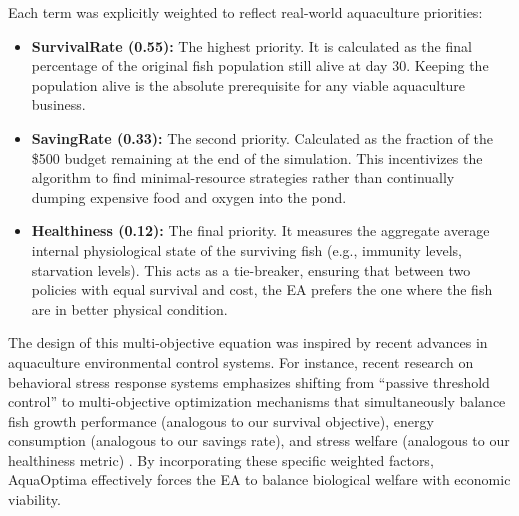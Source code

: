 \documentclass[conference]{IEEEtran}
\begin{document}
Each term was explicitly weighted to reflect real-world aquaculture priorities:
\begin{itemize}
    \item \textbf{SurvivalRate (0.55):} The highest priority. It is calculated as the final percentage of the original fish population still alive at day 30. Keeping the population alive is the absolute prerequisite for any viable aquaculture business.
    \item \textbf{SavingRate (0.33):} The second priority. Calculated as the fraction of the \$500 budget remaining at the end of the simulation. This incentivizes the algorithm to find minimal-resource strategies rather than continually dumping expensive food and oxygen into the pond.
    \item \textbf{Healthiness (0.12):} The final priority. It measures the aggregate average internal physiological state of the surviving fish (e.g., immunity levels, starvation levels). This acts as a tie-breaker, ensuring that between two policies with equal survival and cost, the EA prefers the one where the fish are in better physical condition.
\end{itemize}

The design of this multi-objective equation was inspired by recent advances in aquaculture environmental control systems. For instance, recent research on behavioral stress response systems emphasizes shifting from ``passive threshold control'' to multi-objective optimization mechanisms that simultaneously balance fish growth performance (analogous to our survival objective), energy consumption (analogous to our savings rate), and stress welfare (analogous to our healthiness metric) \cite{pmc_multi_obj}. By incorporating these specific weighted factors, AquaOptima effectively forces the EA to balance biological welfare with economic viability.
\end{document}
